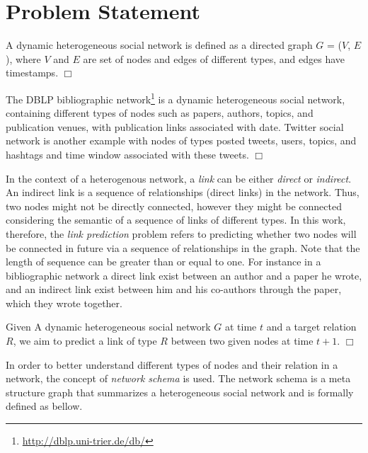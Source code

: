 \section{Problem Statement}

\begin{definition}
A dynamic heterogeneous social network is defined as a directed graph $G$ = ($V$, $E$), where $V$ and $E$ are set of nodes and edges of different types, and edges have timestamps. $\Box$
\end{definition}

\begin{example}
The DBLP bibliographic network\footnote{\url{http://dblp.uni-trier.de/db/}} is a dynamic heterogeneous social network, containing different types of nodes such as papers, authors, topics, and publication venues, with publication links associated with date. Twitter social network is another example with nodes of types posted tweets, users, topics, and hashtags and time window associated with these tweets. $\Box$
\end{example}

In the context of a heterogenous network, a \textit{link} can be either \textit{direct} or \textit{indirect}. An indirect link is a sequence of relationships (direct links) in the network. Thus, two nodes might not be directly connected, however they might be connected considering the semantic of a sequence of links of different types. In this work, therefore, the \textit{link prediction} problem refers to predicting whether two nodes will be connected in future via a sequence of relationships in the graph. Note that the length of sequence can be greater than or equal to one. For instance in a bibliographic network a direct link exist between an author and a paper he wrote, and an indirect link exist between him and his co-authors through the paper, which they wrote together.

\begin{definition}\label{problemdef}
 Given A dynamic heterogeneous social network $G$ at time $t$ and a target relation $R$, we aim to predict a link of type $R$ between two given nodes at time $t+1$. $\Box$
 \end{definition}

In order to better understand different types of nodes and their relation in a network, the concept of \textit{network schema} \cite{sun2011pathsim} is used. The network schema is a meta structure graph that summarizes a heterogeneous social network and is formally defined as bellow.

